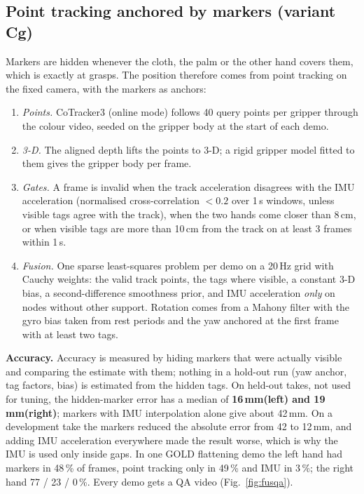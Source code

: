 \documentclass[conference,10pt]{IEEEtran}
\newcommand{\mm}{\,mm\xspace}
\begin{document}
\subsection{Point tracking anchored by markers (variant Cg)}
Markers are hidden whenever the cloth, the palm or the other hand covers them, which is exactly at grasps. The position
therefore comes from point tracking on the fixed camera, with the markers as anchors:
\begin{enumerate}
\item \emph{Points.} CoTracker3 (online mode) follows 40 query points per gripper through the colour video, seeded on the
  gripper body at the start of each demo.
\item \emph{3-D.} The aligned depth lifts the points to 3-D; a rigid gripper model fitted to them gives the gripper body
  per frame.
\item \emph{Gates.} A frame is invalid when the track acceleration disagrees with the IMU acceleration (normalised
  cross-correlation $<0.2$ over 1\,s windows, unless visible tags agree with the track), when the two hands come closer
  than 8\,cm, or when visible tags are more than 10\,cm from the track on at least 3 frames within 1\,s.
\item \emph{Fusion.} One sparse least-squares problem per demo on a 20\,Hz grid with Cauchy weights: the valid track
  points, the tags where visible, a constant 3-D bias, a second-difference smoothness prior, and IMU acceleration
  \emph{only} on nodes without other support. Rotation comes from a Mahony filter with the gyro bias taken from rest
  periods and the yaw anchored at the first frame with at least two tags.
\end{enumerate}

\textbf{Accuracy.} Accuracy is measured by hiding markers that were actually visible and comparing the estimate with
them; nothing in a hold-out run (yaw anchor, tag factors, bias) is estimated from the hidden tags. On held-out takes,
not used for tuning, the hidden-marker error has a median of \textbf{16\mm (left) and 19\mm (right)}; markers with IMU
interpolation alone give about 42\mm. On a development take the markers reduced the absolute error from 42 to 12\mm,
and adding IMU acceleration everywhere made the result worse, which is why the IMU is used only inside gaps. In one GOLD
flattening demo the left hand had markers in 48\,\% of frames, point tracking only in 49\,\% and IMU in 3\,\%; the right
hand 77 / 23 / 0\,\%. Every demo gets a QA video (Fig.~\ref{fig:fusqa}).
\end{document}
